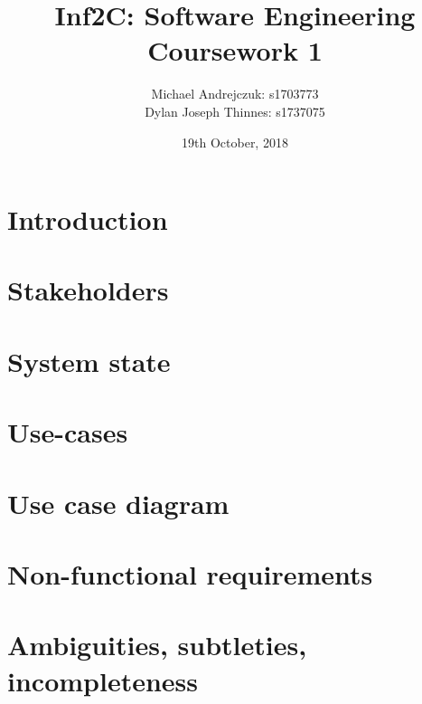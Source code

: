 \documentclass{article}
\begin{document}
\title{Inf2C: Software Engineering \\Coursework 1}
\author{Michael Andrejczuk: s1703773 \\
  Dylan Joseph Thinnes: s1737075}
\date{19th October, 2018}
\maketitle

\section{Introduction}
 
\section{Stakeholders}

\section{System state}

\section{Use-cases}

\section{Use case diagram}

\section{Non-functional requirements}

\section{Ambiguities, subtleties, incompleteness}
\end{document}

